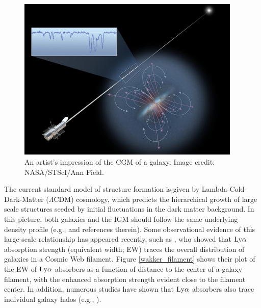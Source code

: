 \begin{figure}[ht!]
        \centering
        \vspace{0pt}
        \includegraphics[width=0.95\textwidth]{Introduction/figures/hubble_cgm.jpg}
        \caption{\small{An artist's impression of the CGM of a galaxy. Image credit: NASA/STScI/Ann Field.}}
        \vspace{5pt}
        \label{cgm_artist}
\end{figure}

The current standard model of structure formation is given by Lambda Cold-Dark-Matter ($\Lambda$CDM) cosmology, which predicts the hierarchical growth of large scale structures seeded by initial fluctuations in the dark matter background. In this picture, both galaxies and the IGM should follow the same underlying density profile (e.g., \citealt{fukugita2006, frieman2008} and references therein). Some observational evidence of this large-scale relationship has appeared recently, such as \cite{wakker2015}, who showed that $\rm Ly\alpha$ absorption strength (equivalent width; EW) traces the overall distribution of galaxies in a Cosmic Web filament. Figure \ref{wakker_filament} shows their plot of the EW of $\rm Ly\alpha$ absorbers as a function of distance to the center of a galaxy filament, with the enhanced absorption strength evident close to the filament center. In addition, numerous studies have shown that $\rm Ly\alpha$ absorbers also trace individual galaxy halos (e.g., \citealt{lanzetta1995, chen1998, chen2001a,  tripp1998, bowen2002, cote2005, wakker2009, steidel2010, prochaska2011, thom2012, stocke2013, tumlinson2013, liang2014, danforth2016}). 


